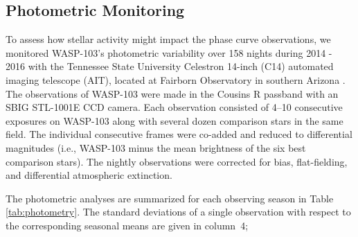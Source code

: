\documentclass[twocolumn, trackchanges]{aastex61}
\begin{document}

\subsection{Photometric Monitoring}
To assess how stellar activity might impact the phase curve observations, we monitored WASP-103's photometric variability over 158 nights during 2014 - 2016 with the Tennessee State University Celestron 14-inch (C14) automated imaging telescope (AIT), located at Fairborn Observatory in southern Arizona \citep[][]{henry99}.  The observations of WASP-103 were made in the Cousins R passband with an SBIG STL-1001E CCD camera.  Each observation consisted of 4--10 consecutive exposures on WASP-103 along with several dozen comparison stars in the same field. The individual consecutive frames were co-added and reduced to differential magnitudes (i.e., WASP-103 minus the mean brightness of the six best comparison stars). The nightly observations were corrected for bias, flat-fielding,  and differential atmospheric extinction.  

The photometric analyses are summarized for each observing season in Table\,\ref{tab:photometry}.  The standard deviations of a single observation with respect to the corresponding seasonal means are given in column~4; 
\end{document}
